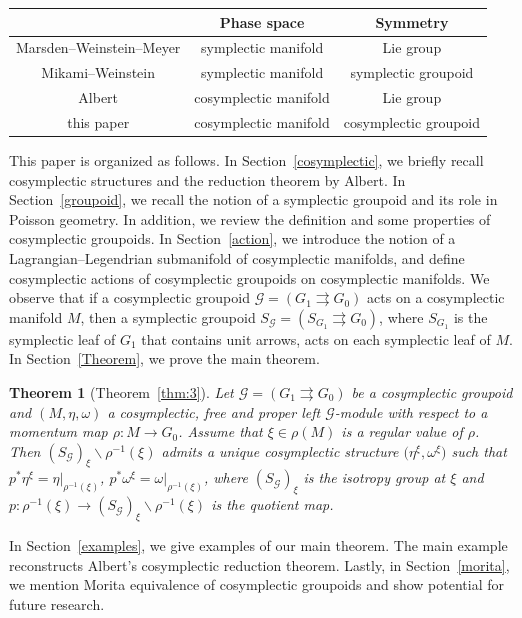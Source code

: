 \documentclass[10pt,a4paper]{amsart}
\numberwithin{equation}{section}
\newtheorem{Theorem}{Theorem}[section]
\begin{document}
\begin{table}[htbp]\renewcommand{\arraystretch}{1.2}
 \centering
 \begin{tabular}{|c||c|c|}
 \hline
 &Phase space&Symmetry\\ \hline
 Marsden--Weinstein--Meyer &symplectic manifold& Lie group\\
 Mikami--Weinstein &symplectic manifold & symplectic groupoid \\
 Albert & cosymplectic manifold & Lie group\\
 this paper&cosymplectic manifold &cosymplectic groupoid \\ \hline
 \end{tabular}
\end{table}

This paper is organized as follows. In Section~\ref{cosymplectic}, we briefly recall cosymplectic structures and the reduction theorem by Albert. In Section~\ref{groupoid}, we recall the notion of a symplectic groupoid and its role in Poisson geometry. In addition, we review the definition and some properties of cosymplectic groupoids. In Section~\ref{action}, we introduce the notion of a Lagrangian--Legendrian submanifold of cosymplectic manifolds, and define cosymplectic actions of cosymplectic groupoids on cosymplectic manifolds. We observe that if a cosymplectic groupoid $\mathcal{G}=(G_1\rightrightarrows G_0)$ acts on a cosymplectic manifold $M$, then a symplectic groupoid $S_\mathcal{G}=(S_{G_1}\rightrightarrows G_0)$, where $S_{G_1}$ is the symplectic leaf of $G_1$ that contains unit arrows, acts on each symplectic leaf of $M$. In Section~\ref{Theorem}, we prove the main theorem.

\begin{Theorem}[Theorem~\ref{thm:3}]
 Let $\mathcal{G}=(G_1\rightrightarrows G_0)$ be a cosymplectic groupoid and $(M,\eta,\omega)$ a cosymplectic, free and proper left $\mathcal{G}$-module with respect to a momentum map $\rho\colon M\to G_0$. Assume that $\xi\in\rho(M)$ is a regular value of $\rho$. Then $(S_{\mathcal{G}})_\xi\backslash \rho^{-1}(\xi)$ admits a unique cosymplectic structure $\bigl(\eta^\xi,\omega^\xi\bigr)$ such that $p^\ast\eta^\xi=\eta|_{\rho^{-1}(\xi)}$, $ p^\ast\omega^\xi=\omega|_{\rho^{-1}(\xi)}$, where $(S_{\mathcal{G}})_\xi$ is the isotropy group at $\xi$ and $p\colon\rho^{-1}(\xi)\to (S_{\mathcal{G}})_\xi\backslash \rho^{-1}(\xi)$ is the quotient map.
\end{Theorem}

In Section~\ref{examples}, we give examples of our main theorem. The main example reconstructs Albert's cosymplectic reduction theorem. Lastly, in Section~\ref{morita}, we mention Morita equivalence of cosymplectic groupoids and show potential for future research.
\end{document}
